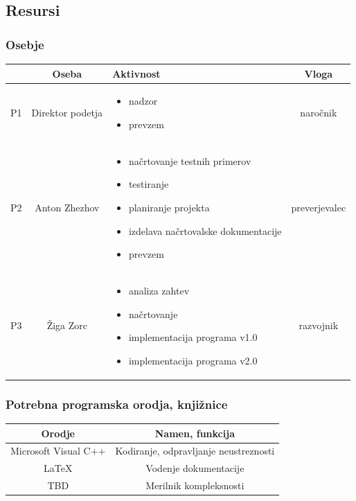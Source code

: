 \documentclass[a4paper,12pt]{article}
\begin{document}
\newpage

	\subsection{Resursi}

		\subsubsection{Osebje}
			\begin{center}
			\begin{tabular}{|c|c|>{\centering}m{}|c|}
				\hline
				&Oseba&Aktivnost&Vloga\\
				\hline
			  P1&Direktor podetja&
			\begin{itemize}
				\item nadzor
				\item prevzem
			\end{itemize}&naročnik\\
				\hline
			  P2&Anton Zhezhov&
				\begin{itemize}
					\item načrtovanje testnih primerov
					\item testiranje
					\item planiranje projekta
					\item izdelava načrtovalske dokumentacije
					\item prevzem
				\end{itemize}&preverjevalec\\
				\hline
			  P3&Žiga Zorc&
				\begin{itemize}
					\item analiza zahtev
					\item načrtovanje
					\item implementacija programa v1.0
					\item implementacija programa v2.0
				\end{itemize}&razvojnik\\
				\hline
			\end{tabular}
			\end{center}
		
		\subsubsection{Potrebna programska orodja, knjižnice}
			\begin{center}
			\begin{tabular}{|c|c|}
					\hline
					\rowcolor{purple!30!} Orodje& Namen, funkcija\\
					\hline
					Microsoft Visual C++& Kodiranje, odpravljanje neustreznosti\\
					\hline
					\LaTeX &Vodenje dokumentacije\\
					\hline
					TBD& Merilnik kompleksnosti\\
					\hline
			\end{tabular}
			\end{center}
\end{document}
